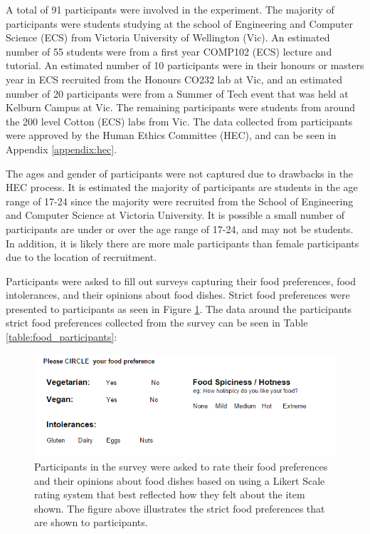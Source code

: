 A total of 91 participants were involved in the experiment. The majority of participants were students studying at the school of Engineering and Computer Science (ECS) from Victoria University of Wellington (Vic). An estimated number of 55 students were from a first year COMP102 (ECS) lecture and tutorial. An estimated number of 10 participants were in their honours or masters year in ECS recruited from the Honours CO232 lab at Vic, and an estimated number of 20 participants were from a Summer of Tech event that was held at Kelburn Campus at Vic. The remaining participants were students from around the 200 level Cotton (ECS) labs from Vic. The data collected from participants were approved by the Human Ethics Committee (HEC), and can be seen in Appendix \ref{appendix:hec}.

The ages and gender of participants were not captured due to drawbacks in the HEC process. It is estimated the majority of participants are students in the age range of 17-24 since the majority were recruited from the School of Engineering and Computer Science at Victoria University. It is possible a small number of participants are under or over the age range of 17-24, and may not be students. In addition, it is likely there are more male participants than female participants due to the location of recruitment.

Participants were asked to fill out surveys capturing their food preferences, food intolerances, and their opinions about food dishes. Strict food preferences were presented to participants as seen in Figure \ref{fig:strict_prefs}. The data around the participants strict food preferences collected from the survey can be seen in Table \ref{table:food_participants}:

\begin{figure}
\centering
\includegraphics[scale=0.8]{images/strict_prefs.png}
\caption{Participants in the survey were asked to rate their food preferences and their opinions about food dishes based on using a Likert Scale rating system that best reflected how they felt about the item shown. The figure above illustrates the strict food preferences that are shown to participants.}
\label{fig:strict_prefs}
\end{figure}

